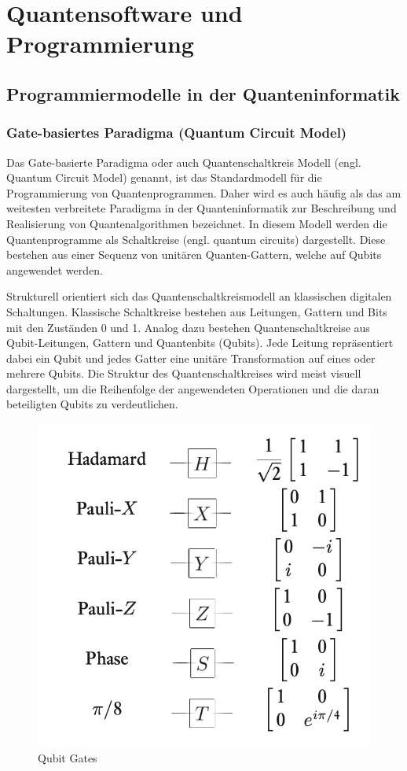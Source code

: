 \chapter{Quantensoftware und Programmierung}
\label{programming} %



\section{Programmiermodelle in der Quanteninformatik}
\label{programming-models}
\subsection{Gate-basiertes Paradigma (Quantum Circuit Model)}
Das Gate-basierte Paradigma oder auch Quantenschaltkreis Modell (engl. Quantum Circuit Model) genannt, ist das Standardmodell für die Programmierung von Quantenprogrammen. Daher wird es auch häufig als das am weitesten verbreitete Paradigma in der Quanteninformatik zur Beschreibung und Realisierung von Quantenalgorithmen bezeichnet. In diesem Modell werden die Quantenprogramme als Schaltkreise (engl. quantum circuits) dargestellt. Diese bestehen aus einer Sequenz von unitären Quanten-Gattern, welche auf Qubits angewendet werden. 

Strukturell orientiert sich das Quantenschaltkreismodell an klassischen digitalen Schaltungen. Klassische Schaltkreise bestehen aus Leitungen, Gattern und Bits mit den Zuständen 0 und 1. Analog dazu bestehen Quantenschaltkreise aus Qubit-Leitungen, Gattern und Quantenbits (Qubits). Jede Leitung repräsentiert dabei ein Qubit und jedes Gatter eine unitäre Transformation auf eines oder mehrere Qubits. Die Struktur des Quantenschaltkreises wird meist visuell dargestellt, um die Reihenfolge der angewendeten Operationen und die daran beteiligten Qubits zu verdeutlichen.

\begin{figure}[ht!]
    \centering
    \includegraphics[width=0.5\linewidth]{images/qubit_gates.png}
    \caption{Qubit Gates \autocite[177]{nielsen_quantum_2010}}
    \label{fig:enter-label}
\end{figure}

